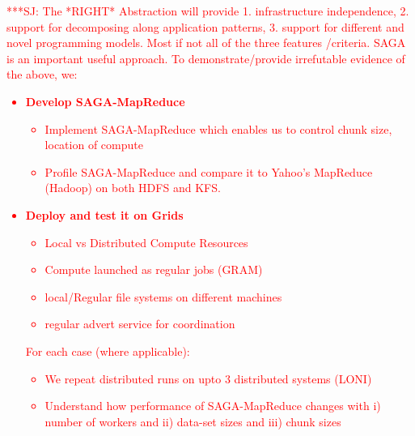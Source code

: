 \documentclass[conference,final]{IEEEtran}
\newcommand{\jhanote}[1]{ {\textcolor{red} { ***SJ: #1 }}}
\newcommand{\jhanote}[1]{}
\begin{document}


\jhanote{The *RIGHT* Abstraction will provide 1. infrastructure independence,
2. support for decomposing along application patterns, 3. support for
different and novel programming models. Most if not all of the three
features /criteria. SAGA is an important useful approach.  To
demonstrate/provide irrefutable evidence of the above, we:

\begin{itemize}
\item {\bf Develop SAGA-MapReduce }

  \begin{itemize}
  \item Implement SAGA-MapReduce which enables us to control chunk
    size, location of compute
  \item Profile SAGA-MapReduce and compare it to Yahoo's MapReduce
    (Hadoop) on both HDFS and KFS.
  \end{itemize}

\item {\bf Deploy and test it on Grids}
  \begin{itemize}
  \item Local vs Distributed Compute Resources
  \item Compute launched as regular jobs (GRAM)
  \item local/Regular file systems on different machines
  \item regular advert service for coordination
  \end{itemize}

For each case (where applicable):
  \begin{itemize}
  \item We repeat distributed runs on upto 3 distributed systems
    (LONI)
  \item Understand how performance of SAGA-MapReduce changes with i)
    number of workers and ii) data-set sizes and iii) chunk sizes
  \end{itemize}


\end{itemize}}
\end{document}
